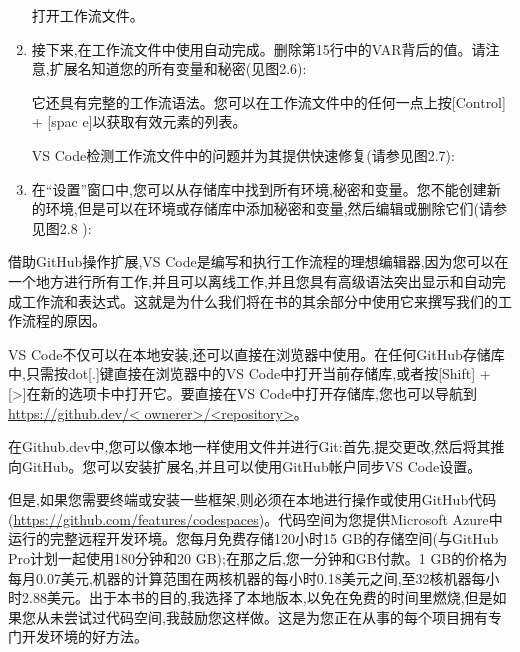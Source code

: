 \begin{enumerate}

打开工作流文件。

\item 
接下来,在工作流文件中使用自动完成。删除第15行中的VAR背后的值。请注意,扩展名知道您的所有变量和秘密(见图2.6):


它还具有完整的工作流语法。您可以在工作流文件中的任何一点上按[Control] + [spac e]以获取有效元素的列表。

VS Code检测工作流文件中的问题并为其提供快速修复(请参见图2.7):


\item 
在“设置”窗口中,您可以从存储库中找到所有环境,秘密和变量。您不能创建新的环境,但是可以在环境或存储库中添加秘密和变量,然后编辑或删除它们(请参见图2.8 ):


\end{enumerate}


借助GitHub操作扩展,VS Code是编写和执行工作流程的理想编辑器,因为您可以在一个地方进行所有工作,并且可以离线工作,并且您具有高级语法突出显示和自动完成工作流和表达式。这就是为什么我们将在书的其余部分中使用它来撰写我们的工作流程的原因。


VS Code不仅可以在本地安装,还可以直接在浏览器中使用。在任何GitHub存储库中,只需按dot[.]键直接在浏览器中的VS Code中打开当前存储库,或者按[Shift] + [>]在新的选项卡中打开它。要直接在VS Code中打开存储库,您也可以导航到\url{https://github.dev/< ownerer>/<repository>}。

在Github.dev中,您可以像本地一样使用文件并进行Git:首先,提交更改,然后将其推向GitHub。您可以安装扩展名,并且可以使用GitHub帐户同步VS Code设置。

但是,如果您需要终端或安装一些框架,则必须在本地进行操作或使用GitHub代码(\url{https://github.com/features/codespaces})。代码空间为您提供Microsoft Azure中运行的完整远程开发环境。您每月免费存储120小时15 GB的存储空间(与GitHub Pro计划一起使用180分钟和20 GB);在那之后,您一分钟和GB付款。1 GB的价格为每月0.07美元,机器的计算范围在两核机器的每小时0.18美元之间,至32核机器每小时2.88美元。出于本书的目的,我选择了本地版本,以免在免费的时间里燃烧,但是如果您从未尝试过代码空间,我鼓励您这样做。这是为您正在从事的每个项目拥有专门开发环境的好方法。